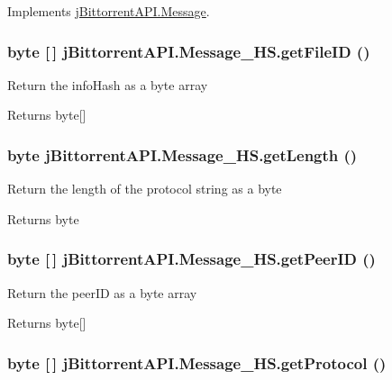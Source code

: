 Implements \hyperlink{classj_bittorrent_a_p_i_1_1_message}{jBittorrentAPI.Message}.\hypertarget{classj_bittorrent_a_p_i_1_1_message___h_s_a3c6ed7fb69274f946919bef1ce8f0968}{
\subsubsection[{getFileID}]{\setlength{\rightskip}{0pt plus 5cm}byte \mbox{[}$\,$\mbox{]} jBittorrentAPI.Message\_\-HS.getFileID ()}}
\label{classj_bittorrent_a_p_i_1_1_message___h_s_a3c6ed7fb69274f946919bef1ce8f0968}
Return the infoHash as a byte array \begin{DoxyReturn}{Returns}
byte\mbox{[}\mbox{]} 
\end{DoxyReturn}
\hypertarget{classj_bittorrent_a_p_i_1_1_message___h_s_a847d44cfb0f8c03c4ed3b81a41cff240}{
\subsubsection[{getLength}]{\setlength{\rightskip}{0pt plus 5cm}byte jBittorrentAPI.Message\_\-HS.getLength ()}}
\label{classj_bittorrent_a_p_i_1_1_message___h_s_a847d44cfb0f8c03c4ed3b81a41cff240}
Return the length of the protocol string as a byte \begin{DoxyReturn}{Returns}
byte 
\end{DoxyReturn}
\hypertarget{classj_bittorrent_a_p_i_1_1_message___h_s_a59ac855807e9c0821d5633b58aa88d05}{
\subsubsection[{getPeerID}]{\setlength{\rightskip}{0pt plus 5cm}byte \mbox{[}$\,$\mbox{]} jBittorrentAPI.Message\_\-HS.getPeerID ()}}
\label{classj_bittorrent_a_p_i_1_1_message___h_s_a59ac855807e9c0821d5633b58aa88d05}
Return the peerID as a byte array \begin{DoxyReturn}{Returns}
byte\mbox{[}\mbox{]} 
\end{DoxyReturn}
\hypertarget{classj_bittorrent_a_p_i_1_1_message___h_s_a16053a0dcd33bc941bb0e6c173ccea79}{
\subsubsection[{getProtocol}]{\setlength{\rightskip}{0pt plus 5cm}byte \mbox{[}$\,$\mbox{]} jBittorrentAPI.Message\_\-HS.getProtocol ()}}
